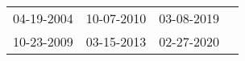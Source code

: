 \begin{supertabular}{llll}
 04-19-2004 &  10-07-2010 &  03-08-2019 \\
 10-23-2009 &  03-15-2013 &  02-27-2020 \\
\end{supertabular}
